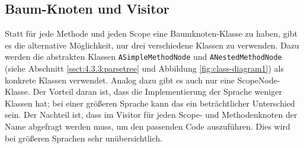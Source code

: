 \subsection{Baum-Knoten und Visitor}\label{ssct:4.4.2:alt-knoten-visitor}
Statt für jede Methode und jeden Scope eine Baumknoten-Klasse zu haben, gibt es die alternative Möglichkeit, nur drei verschiedene Klassen zu verwenden. Dazu werden die abstrakten Klassen \texttt{ASimpleMethodNode} und \texttt{ANestedMethodNode} (siehe Abschnitt \ref{ssct:4.3.3:parsetree} und Abbildung \ref{fig:class-diagram1}) als konkrete Klassen verwendet. Analog dazu gibt es auch nur eine ScopeNode-Klasse. Der Vorteil daran ist, dass die Implementierung der Sprache weniger Klassen hat; bei einer größeren Sprache kann das ein beträchtlicher Unterschied sein. Der Nachteil ist, dass im Visitor für jeden Scope- und Methodenknoten der Name abgefragt werden muss, um den passenden Code auszuführen. Dies wird bei größeren Sprachen sehr unübersichtlich.